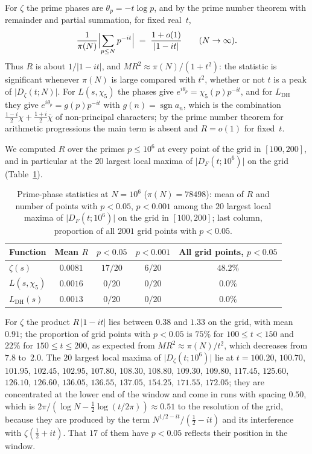 \documentclass[11pt]{amsart}
\theoremstyle{definition}
\theoremstyle{remark}
\renewcommand{\DH}{\mathrm{DH}}
\newcommand{\abs}[1]{\lvert #1 \rvert}
\begin{document}
For $\zeta$ the prime phases are $\theta_p=-t\log p$, and by the prime
number theorem with remainder \cite[Ch.~18]{Davenport2000} and partial
summation, for fixed real~$t$,
\[
  \frac1{\pi(N)}\Bigl|\sum_{p\le N}p^{-it}\Bigr|
  \;=\;\frac{1+o(1)}{\abs{1-it}}\qquad(N\to\infty).
\]
Thus $R$ is about $1/\abs{1-it}$, and $MR^2\approx\pi(N)/(1+t^2)$: the
statistic is significant whenever $\pi(N)$ is large compared with $t^2$,
whether or not $t$ is a peak of $\abs{D_\zeta(t;N)}$.  For $L(s,\chi_5)$
the phases give $e^{i\theta_p}=\chi_5(p)p^{-it}$, and for $L_{\DH}$ they
give $e^{i\theta_p}=g(p)p^{-it}$ with $g(n)=\operatorname{sgn}a_n$, which
is the combination
$\tfrac{1-i}{2}\chi+\tfrac{1+i}{2}\bar\chi$ of non-principal characters;
by the prime number theorem for arithmetic progressions
\cite[Ch.~20]{Davenport2000} the main term is absent and $R=o(1)$ for
fixed~$t$.

We computed $R$ over the primes $p\le10^6$ at every point of the grid in
$[100,200]$, and in particular at the $20$ largest local maxima of
$\abs{D_F(t;10^6)}$ on the grid (Table~\ref{tab:prime-phases}).

\begin{table}[ht]
\centering
\caption{Prime-phase statistics at $N=10^6$ ($\pi(N)=78498$): mean of $R$
  and number of points with $p<0.05$, $p<0.001$ among the $20$ largest
  local maxima of $\abs{D_F(t;10^6)}$ on the grid in $[100,200]$; last
  column, proportion of all $2001$ grid points with $p<0.05$.}
\label{tab:prime-phases}
\begin{tabular}{@{}lcccc@{}}
\toprule
Function & Mean $R$ & $p < 0.05$ & $p < 0.001$ & All grid points, $p<0.05$ \\
\midrule
$\zeta(s)$       & $0.0081$ & $17/20$ & $6/20$ & $48.2\%$ \\
$L(s,\chi_5)$    & $0.0016$ & $0/20$  & $0/20$ & $0.0\%$ \\
$L_{\DH}(s)$     & $0.0013$ & $0/20$  & $0/20$ & $0.0\%$ \\
\bottomrule
\end{tabular}
\end{table}

For $\zeta$ the product $R\,\abs{1-it}$ lies between $0.38$ and $1.33$ on
the grid, with mean $0.91$; the proportion of grid points with $p<0.05$
is $75\%$ for $100\le t<150$ and $22\%$ for $150\le t\le200$, as expected
from $MR^2\approx\pi(N)/t^2$, which decreases from $7.8$ to~$2.0$.  The
$20$ largest local maxima of $\abs{D_\zeta(t;10^6)}$ lie at
$t=100.20$, $100.70$, $101.95$, $102.45$, $102.95$, $107.80$, $108.30$,
$108.80$, $109.30$, $109.80$, $117.45$, $125.60$, $126.10$, $126.60$,
$136.05$, $136.55$, $137.05$, $154.25$, $171.55$, $172.05$; they are
concentrated at the lower end of the window and come in runs with spacing
$0.50$, which is $2\pi/(\log N-\tfrac12\log(t/2\pi))\approx0.51$ to the
resolution of the grid, because they are produced by the term
$N^{1/2-it}/(\tfrac12-it)$ and its interference with
$\zeta(\tfrac12+it)$.  That $17$ of them have $p<0.05$ reflects their
position in the window.
\end{document}

